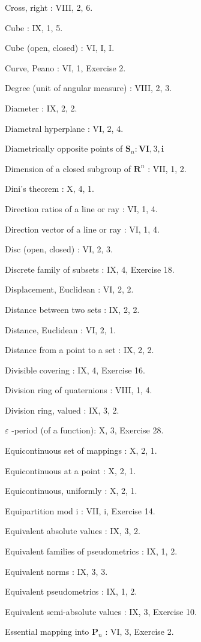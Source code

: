 Cross, right : VIII, 2, 6.

Cube : IX, 1, 5.

Cube (open, closed) : VI, I, I.

Curve, Peano : VI, 1, Exercise 2.

Degree (unit of angular measure) : VIII, 2, 3.

Diameter : IX, 2, 2.

Diametral hyperplane : VI, 2, 4.

Diametrically opposite points of \(\mathbf{S}_n:\mathbf{VI},3,\mathbf{i}\)

Dimension of a closed subgroup of \(\mathbf{R}^n\) : VII, 1, 2.

Dini's theorem : X, 4, 1.

Direction ratios of a line or ray : VI, 1, 4.

Direction vector of a line or ray : VI, 1, 4.

Disc (open, closed) : VI, 2, 3.

Discrete family of subsets : IX, 4, Exercise 18.

Displacement, Euclidean : VI, 2, 2.

Distance between two sets : IX, 2, 2.

Distance, Euclidean : VI, 2, 1.

Distance from a point to a set : IX, 2, 2.

Divisible covering : IX, 4, Exercise 16.

Division ring of quaternions : VIII, 1, 4.

Division ring, valued : IX, 3, 2.

\(\varepsilon\) -period (of a function): X, 3, Exercise 28.

Equicontinuous set of mappings : X, 2, 1.

Equicontinuous at a point : X, 2, 1.

Equicontinuous, uniformly : X, 2, 1.

Equipartition mod i : VII, i, Exercise 14.

Equivalent absolute values : IX, 3, 2.

Equivalent families of pseudometrics : IX, 1, 2.

Equivalent norms : IX, 3, 3.

Equivalent pseudometrics : IX, 1, 2.

Equivalent semi-absolute values : IX, 3, Exercise 10.

Essential mapping into \(\mathbf{P}_n\) : VI, 3, Exercise 2.

